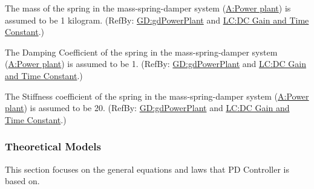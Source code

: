 \documentclass[12pt]{article}
\begin{document}
\begin{description}[font=\normalfont]
\item[Spring Mass:\phantomsection\label{massSpring}]{The mass of the spring in the mass-spring-damper system (\hyperref[pwrPlant]{A:Power plant}) is assumed to be 1 kilogram. (RefBy: \hyperref[GD:gdPowerPlant]{GD:gdPowerPlant} and \hyperref[likeChgPP]{LC:DC Gain and Time Constant}.)}
\item[Spring Damping Coefficient:\phantomsection\label{dampingCoeffSpring}]{The Damping Coefficient of the spring in the mass-spring-damper system (\hyperref[pwrPlant]{A:Power plant}) is assumed to be 1. (RefBy: \hyperref[GD:gdPowerPlant]{GD:gdPowerPlant} and \hyperref[likeChgPP]{LC:DC Gain and Time Constant}.)}
\item[Spring Stiffness Coefficient:\phantomsection\label{stiffnessCoeffSpring}]{The Stiffness coefficient of the spring in the mass-spring-damper system (\hyperref[pwrPlant]{A:Power plant}) is assumed to be 20. (RefBy: \hyperref[GD:gdPowerPlant]{GD:gdPowerPlant} and \hyperref[likeChgPP]{LC:DC Gain and Time Constant}.)}
\end{description}
\subsubsection{Theoretical Models}
\label{Sec:TMs}
This section focuses on the general equations and laws that PD Controller is based on.
\end{document}
